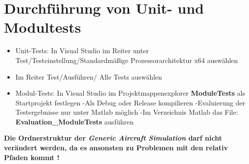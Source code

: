 \documentclass[
11pt,				%
a4paper,			%
DIV12,		     	%
liststotoc,			%
bibliography=totoc, %
listof=entryprefix, %
listot=entryprefix, %
appendixprefix=true,
pointlessnumbers,
	oneside,		%
]{scrbook}
\begin{document}
\section{Durchführung von Unit- und Modultests}
\begin{itemize}
	\item Unit-Tests: In Visual Studio im Reiter unter Test/Testeinstellung/Standardmäßige Prozessorarchitektur x64 auswählen
	\item Im Reiter Test/Ausführen/ Alle Tests auswählen
	\item Modul-Tests: In Visual Studio im Projektmappenexplorer \textbf{ModuleTests} als Startprojekt festlegen
	\subitem -Als Debug oder Release kompilieren 
	\subitem -Evaluierung der Testergebnisse nur unter Matlab möglich
	\subitem -Im Verzeichnis Matlab das File: \textbf{Evaluation\_ModuleTests} ausführen
\end{itemize} 

\textbf{Die Ordnerstruktur der \textit{Generic Aircraft Simulation} darf nicht verändert werden, da es ansonsten zu Problemen mit den relativ Pfaden kommt !}
\end{document}
